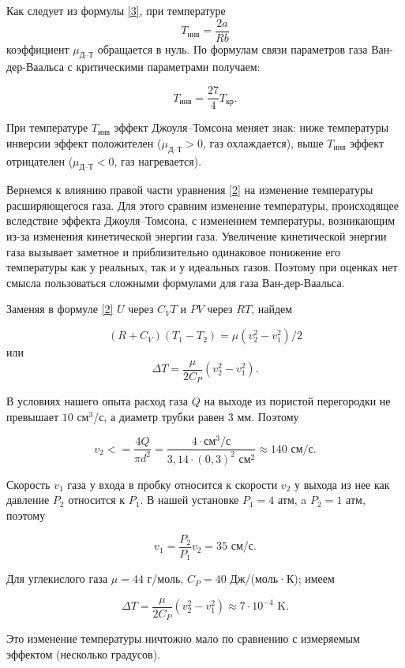 \documentclass[12pt]{article}
\begin{document}
Как следует из формулы \ref{3}, при температуре \[ T_{\text{инв}} = \frac{2a}{Rb} \] коэффициент $ \mu_\text{Д--Т} $ обращается в нуль. По формулам связи параметров газа Ван-дер-Ваальса с критическими параметрами получаем: 

\begin{equation}\label{4}
    T_\text{инв} = \frac{27}{4} T_\text{кр}.
\end{equation}

При температуре $ T_\text{инв} $ эффект Джоуля–Томсона меняет знак: ниже температуры инверсии эффект положителен ($ \mu_\text{Д--Т} > 0 $, газ охлаждается), выше $ T_\text{инв} $ эффект отрицателен ($ \mu_\text{Д--Т} < 0 $, газ нагревается).

Вернемся к влиянию правой части уравнения \ref{2} на изменение температуры расширяющегося газа. Для этого сравним изменение температуры, происходящее вследствие эффекта Джоуля–Томсона, с изменением температуры, возникающим из-за изменения кинетической энергии газа. Увеличение кинетической энергии газа вызывает заметное и приблизительно одинаковое понижение его температуры как у реальных, так и у идеальных газов. Поэтому при оценках нет смысла пользоваться сложными формулами для газа Ван-дер-Ваальса.

Заменяя в формуле \ref{2} $ U $ через $ C_VT $ и $ PV $ через $ RT $, найдем

\[ \left(R+C_V\right)\left(T_1-T_2\right)=\mu\left(v_2^2-v_1^2\right)/2 \]
или
\[ \Delta T = \frac{\mu}{2C_P}\left(v_2^2-v_1^2\right). \]

В условиях нашего опыта расход газа $ Q  $ на выходе из пористой перегородки не превышает $ 10 $ см$ ^3 $/с, а диаметр трубки равен 3 мм. Поэтому

\[ v_2<=\frac{4Q}{\pi d^2} = \frac{4\cdot\text{см}^3/\text{с}}{3,14\cdot(0,3)^2\text{ см}^2} \approx 140 \text{ см}/\text{с}. \]

Скорость $ v_1 $ газа у входа в пробку относится к скорости $ v_2 $ у выхода из нее как давление $ P_2 $ относится к $ P_1 $. В нашей установке $ P_1 = 4 $ атм, a $ P_2 = 1 $ атм, поэтому

\[ v_1=\frac{P_2}{P_1}v_2 = 35 \text{ см}/\text{с}. \]

Для углекислого газа $ \mu = 44 $ г/моль, $ C_P = 40 $ Дж/(моль·К); имеем

\[ \Delta T = \frac{\mu}{2C_P}\left(v_2^2-v_1^2\right) \approx 7\cdot10^{-4} \text{ K}. \]

Это изменение температуры ничтожно мало по сравнению с измеряемым эффектом (несколько градусов).
\end{document}
